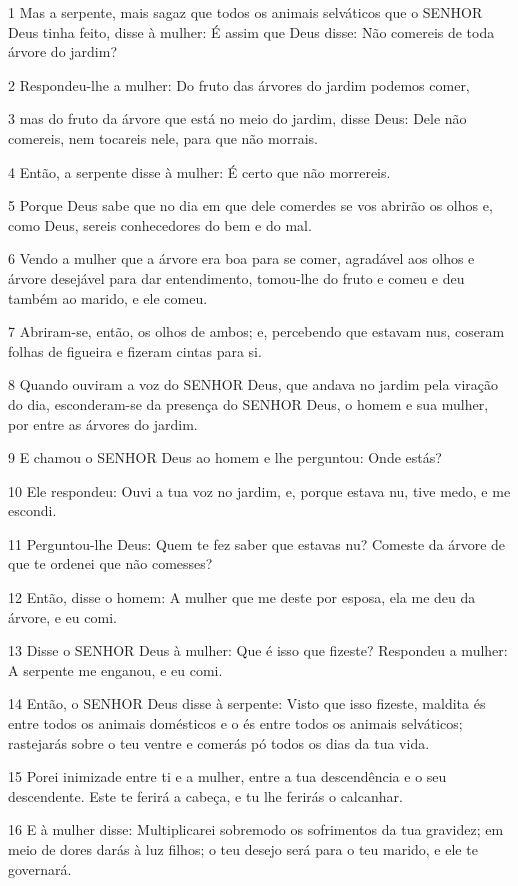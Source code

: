 \par 1 Mas a serpente, mais sagaz que todos os animais selváticos que o SENHOR Deus tinha feito, disse à mulher: É assim que Deus disse: Não comereis de toda árvore do jardim?
\par 2 Respondeu-lhe a mulher: Do fruto das árvores do jardim podemos comer,
\par 3 mas do fruto da árvore que está no meio do jardim, disse Deus: Dele não comereis, nem tocareis nele, para que não morrais.
\par 4 Então, a serpente disse à mulher: É certo que não morrereis.
\par 5 Porque Deus sabe que no dia em que dele comerdes se vos abrirão os olhos e, como Deus, sereis conhecedores do bem e do mal.
\par 6 Vendo a mulher que a árvore era boa para se comer, agradável aos olhos e árvore desejável para dar entendimento, tomou-lhe do fruto e comeu e deu também ao marido, e ele comeu.
\par 7 Abriram-se, então, os olhos de ambos; e, percebendo que estavam nus, coseram folhas de figueira e fizeram cintas para si.
\par 8 Quando ouviram a voz do SENHOR Deus, que andava no jardim pela viração do dia, esconderam-se da presença do SENHOR Deus, o homem e sua mulher, por entre as árvores do jardim.
\par 9 E chamou o SENHOR Deus ao homem e lhe perguntou: Onde estás?
\par 10 Ele respondeu: Ouvi a tua voz no jardim, e, porque estava nu, tive medo, e me escondi.
\par 11 Perguntou-lhe Deus: Quem te fez saber que estavas nu? Comeste da árvore de que te ordenei que não comesses?
\par 12 Então, disse o homem: A mulher que me deste por esposa, ela me deu da árvore, e eu comi.
\par 13 Disse o SENHOR Deus à mulher: Que é isso que fizeste? Respondeu a mulher: A serpente me enganou, e eu comi.
\par 14 Então, o SENHOR Deus disse à serpente: Visto que isso fizeste, maldita és entre todos os animais domésticos e o és entre todos os animais selváticos; rastejarás sobre o teu ventre e comerás pó todos os dias da tua vida.
\par 15 Porei inimizade entre ti e a mulher, entre a tua descendência e o seu descendente. Este te ferirá a cabeça, e tu lhe ferirás o calcanhar.
\par 16 E à mulher disse: Multiplicarei sobremodo os sofrimentos da tua gravidez; em meio de dores darás à luz filhos; o teu desejo será para o teu marido, e ele te governará.
